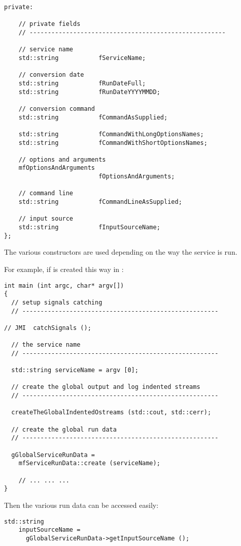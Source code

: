 \begin{lstlisting}[language=CPlusPlus]
  private:

    // private fields
    // ------------------------------------------------------

    // service name
    std::string           fServiceName;

    // conversion date
    std::string           fRunDateFull;
    std::string           fRunDateYYYYMMDD;

    // conversion command
    std::string           fCommandAsSupplied;

    std::string           fCommandWithLongOptionsNames;
    std::string           fCommandWithShortOptionsNames;

    // options and arguments
    mfOptionsAndArguments
                          fOptionsAndArguments;

    // command line
    std::string           fCommandLineAsSupplied;

    // input source
    std::string           fInputSourceName;
};
\end{lstlisting}

The various constructors are used depending on the way the service is run.

For example, if is created this way in :
\begin{lstlisting}[language=CPlusPlus]
int main (int argc, char* argv[])
{
  // setup signals catching
  // ------------------------------------------------------

// JMI	catchSignals ();

  // the service name
  // ------------------------------------------------------

  std::string serviceName = argv [0];

  // create the global output and log indented streams
  // ------------------------------------------------------

  createTheGlobalIndentedOstreams (std::cout, std::cerr);

  // create the global run data
  // ------------------------------------------------------

  gGlobalServiceRunData =
    mfServiceRunData::create (serviceName);

	// ... ... ...
}
\end{lstlisting}

Then the various run data can be accessed easily:
\begin{lstlisting}[language=CPlusPlus]
  std::string
    inputSourceName =
      gGlobalServiceRunData->getInputSourceName ();
\end{lstlisting}

